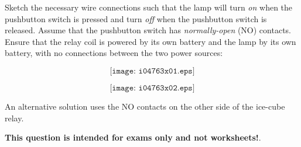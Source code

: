 

Sketch the necessary wire connections such that the lamp will turn {\it on} when the pushbutton switch is pressed and turn {\it off} when the pushbutton switch is released.  Assume that the pushbutton switch has {\it normally-open} (NO) contacts.  Ensure that the relay coil is powered by its own battery and the lamp by its own battery, with no connections between the two power sources:

$$\texttt{[image: i04763x01.eps]}$$







$$\texttt{[image: i04763x02.eps]}$$

An alternative solution uses the NO contacts on the other side of the ice-cube relay.







{\bf This question is intended for exams only and not worksheets!}.



